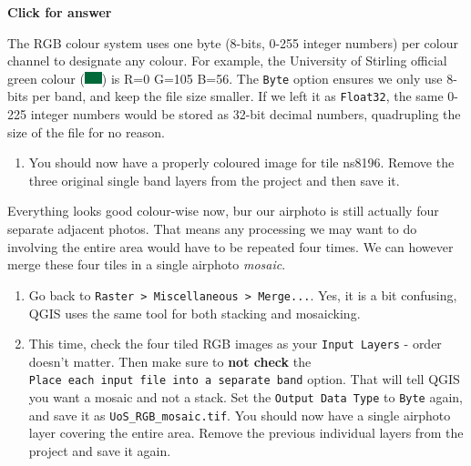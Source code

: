 \documentclass[
  letterpaper,
  DIV=11,
  numbers=noendperiod]{scrreprt}
\providecommand{\tightlist}{%
  \setlength{\itemsep}{0pt}\setlength{\parskip}{0pt}}\usepackage{longtable,booktabs,array}
\begin{document}
\begin{tcolorbox}[enhanced jigsaw, toprule=.15mm, breakable, left=2mm, colframe=quarto-callout-important-color-frame, colback=white, arc=.35mm, leftrule=.75mm, opacityback=0, rightrule=.15mm, bottomrule=.15mm]

\vspace{-3mm}\textbf{Click for answer}\vspace{3mm}

The RGB colour system uses one byte (8-bits, 0-255 integer numbers) per
colour channel to designate any colour. For example, the University of
Stirling official green colour
(\includegraphics{images/lab_6/lab_6_fig9_StirColor.jpg}) is R=0 G=105
B=56. The \texttt{Byte} option ensures we only use 8-bits per band, and
keep the file size smaller. If we left it as \texttt{Float32}, the same
0-225 integer numbers would be stored as 32-bit decimal numbers,
quadrupling the size of the file for no reason.

\end{tcolorbox}

\begin{enumerate}
\def\labelenumi{(\arabic{enumi})}
\setcounter{enumi}{178}
\tightlist
\item
  You should now have a properly coloured image for tile ns8196. Remove
  the three original single band layers from the project and then save
  it.
\end{enumerate}

Everything looks good colour-wise now, bur our airphoto is still
actually four separate adjacent photos. That means any processing we may
want to do involving the entire area would have to be repeated four
times. We can however merge these four tiles in a single airphoto
\emph{mosaic}.

\begin{enumerate}
\def\labelenumi{(\arabic{enumi})}
\setcounter{enumi}{179}
\item
  Go back to
  \texttt{Raster\ \textgreater{}\ Miscellaneous\ \textgreater{}\ Merge...}.
  Yes, it is a bit confusing, QGIS uses the same tool for both stacking
  and mosaicking.
\item
  This time, check the four tiled RGB images as your
  \texttt{Input\ Layers} - order doesn't matter. Then make sure to
  \textbf{not check} the
  \texttt{Place\ each\ input\ file\ into\ a\ separate\ band} option.
  That will tell QGIS you want a mosaic and not a stack. Set the
  \texttt{Output\ Data\ Type} to \texttt{Byte} again, and save it as
  \texttt{UoS\_RGB\_mosaic.tif}. You should now have a single airphoto
  layer covering the entire area. Remove the previous individual layers
  from the project and save it again.
\end{enumerate}
\end{document}
